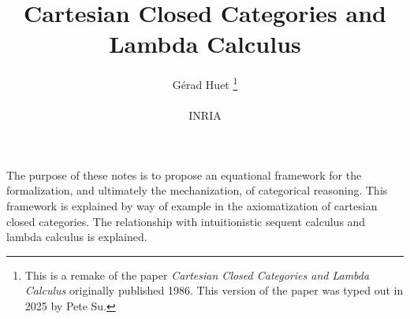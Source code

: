 \makeatletter
\DeclareRobustCommand{\eqx}{\mathrel{\mathpalette\eq@{X}}}
\DeclareRobustCommand{\eqlx}{\mathrel{\mathpalette\eq@{x}}}
\DeclareRobustCommand{\eqy}{\mathrel{\mathpalette\eq@{Y}}}
\DeclareRobustCommand{\eqxx}{\mathrel{\mathpalette\eq@{X \union \{x\}}}}
\DeclareRobustCommand{\eqtx}{\mathrel{\mathpalette\eq@{\trans(X)}}}
\newcommand{\eq@}[2]{%
  \vtop{\offinterlineskip
    \ialign{\hfil##\hfil\cr
      $\m@th#1=$\cr %
      \noalign{\sbox\z@{$\m@th#1\mkern0mu$}\kern-\wd\z@}
      $\m@th\alexey@demote{#1}#2$\cr
    }%
  }%
}
\DeclareRobustCommand{\eqdX}{\mathrel{\mathpalette\eqd@{X}}}
\DeclareRobustCommand{\eqdx}{\mathrel{\mathpalette\eqd@{x}}}
\newcommand{\eqd@}[2]{%
  \vtop{\offinterlineskip
    \ialign{\hfil##\hfil\cr
      $\m@th#1\deqd$\cr %
      \noalign{\sbox\z@{$\m@th#1\mkern0mu$}\kern-\wd\z@}
      $\m@th\alexey@demote{#1}#2$\cr
    }%
  }%
}
\newcommand{\alexey@demote}[1]{%
  \ifx#1\displaystyle\scriptstyle\else
  \ifx#1\textstyle\scriptstyle\else
  \scriptscriptstyle\fi\fi
}

\makeatother

\usepackage{footmisc}

\makeatletter
\let\original@footnotemark\footnotemark
\newcommand{\align@footnotemark}{%
  \ifmeasuring@
    \chardef\@tempfn=\value{footnote}%
    \original@footnotemark
    \setcounter{footnote}{\@tempfn}%
  \else
    \iffirstchoice@
      \original@footnotemark
    \fi
  \fi}
\pretocmd{\start@align}{\let\footnotemark\align@footnotemark}{}{}
\makeatother

\makeatletter
\newcommand*\dotop{\mathpalette\bigcdot@{.6}}
\newcommand*\bigcdot@[2]{\mathbin{\vcenter{\hbox{\scalebox{#2}{$\m@th#1\bullet$}}}}}
\makeatother



\title{\large Cartesian Closed Categories and Lambda Calculus}
\author{\normalsize G\'erad Huet%
\footnote{This is a remake of the paper {\em Cartesian Closed Categories and Lambda Calculus}
originally published 1986. This version of the paper was typed out in 2025 by Pete Su.} 
\\ \\ \small INRIA}


\maketitle

\noindent
The purpose of these notes is to propose an equational framework for the formalization, and
ultimately the mechanization, of categorical reasoning. This framework is explained by way of
example in the axiomatization of cartesian closed categories. The relationship with intuitionistic
sequent calculus and lambda calculus is explained.


